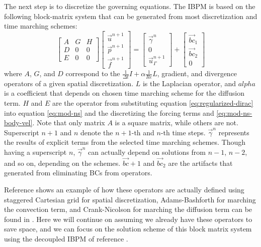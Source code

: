 The next step is to discretize the governing equations.
The IBPM is based on the following block-matrix system that can be generated from most discretization and time marching schemes:
\begin{equation}\label{eq:block-sys-ns}
    \begin{bmatrix}
        A & G & H \\
        D & 0 & 0 \\
        E & 0 & 0
    \end{bmatrix}
    \begin{bmatrix}
        \vec{u}^{n+1} \\
        \vec{p}^{n+1} \\
        \vec{f}^{n+1}
    \end{bmatrix}
    =
    \begin{bmatrix}
        \vec{\gamma}^n \\
        0 \\
        \vec{u}_\Gamma^{n+1}
    \end{bmatrix}
    +
    \begin{bmatrix}
        \vec{bc}_1 \\
        \vec{bc}_2 \\
        0
    \end{bmatrix}
\end{equation}
where $A$, $G$, and $D$ correspond to the $\frac{1}{\Delta t}I+\alpha\frac{1}{Re}L$, gradient, and divergence operators of a given spatial discretization. 
$L$ is the Laplacian operator, and $alpha$ is a coefficient that depends on chosen time marching scheme for the diffusion term.
$H$ and $E$ are the operator from substituting equation \eqref{eq:regularized-dirac} into equation \eqref{eq:mod-ns} and the discretizing the forcing terms and \eqref{eq:mod-ns-body-vel}.
Note that only matrix $A$ is a square matrix, while others are not.
Superscript $n+1$ and $n$ denote the $n+1$-th and $n$-th time steps.
$\vec{\gamma}^n$ represents the results of explicit terms from the selected time marching schemes.
Though having a superscript $n$, $\vec{\gamma}^n$ can actually depend on solutions from $n-1$, $n-2$, and so on, depending on the schemes.
$\vec{bc}+1$ and $\vec{bc}_2$ are the artifacts that generated from eliminating BCs from operators.

Reference \cite{taira_immersed_2007} shows an example of how these operators are actually defined using staggered Cartesian grid for spatial discretization, Adams-Bashforth for marching the convection term, and Crank-Nicolson for marching the diffusion term can be found in \cite{taira_immersed_2007}.
Here we will continue on assuming we already have these operators to save space, and we can focus on the solution scheme of this block matrix system using the decoupled IBPM of reference \cite{li_efficient_2016}.

